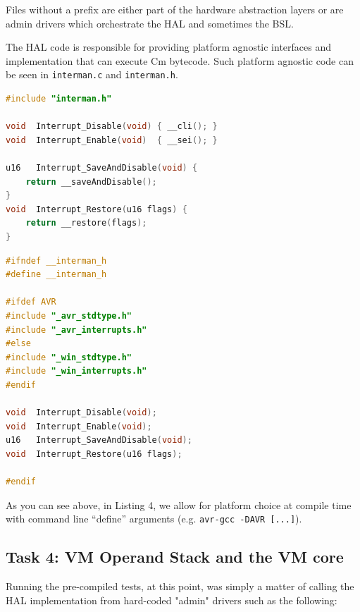\documentclass[11pt]{article}
\begin{document}
Files without a prefix are either part of the hardware abstraction layers or are admin drivers which orchestrate the HAL and sometimes the BSL.

The HAL code is responsible for providing platform agnostic interfaces and implementation that can execute Cm bytecode. Such platform agnostic code can be seen in \lstinline[columns=fixed]{interman.c} and \lstinline[columns=fixed]{interman.h}.

\begin{center}
    \begin{lstlisting}[language=C, columns=fixed, caption=interman.c]
#include "interman.h"

void  Interrupt_Disable(void) { __cli(); }
void  Interrupt_Enable(void)  { __sei(); }

u16   Interrupt_SaveAndDisable(void) { 
    return __saveAndDisable(); 
}
void  Interrupt_Restore(u16 flags) { 
    return __restore(flags);
}
    \end{lstlisting}
\end{center}

\begin{center}
    \begin{lstlisting}[language=C, columns=fixed, caption=interman.h]
#ifndef __interman_h
#define __interman_h

#ifdef AVR
#include "_avr_stdtype.h"
#include "_avr_interrupts.h"
#else
#include "_win_stdtype.h"
#include "_win_interrupts.h"
#endif

void  Interrupt_Disable(void);
void  Interrupt_Enable(void);
u16   Interrupt_SaveAndDisable(void);
void  Interrupt_Restore(u16 flags);

#endif
    \end{lstlisting}
\end{center}

As you can see above, in Listing 4, we allow for platform choice at compile time with command line ``define'' arguments (e.g. \lstinline[columns=fixed]{avr-gcc -DAVR [...]}).


\subsection{Task 4: VM Operand Stack and the VM core}

Running the pre-compiled tests, at this point, was simply a matter of calling the HAL implementation from hard-coded "admin" drivers such as the following:
\end{document}
